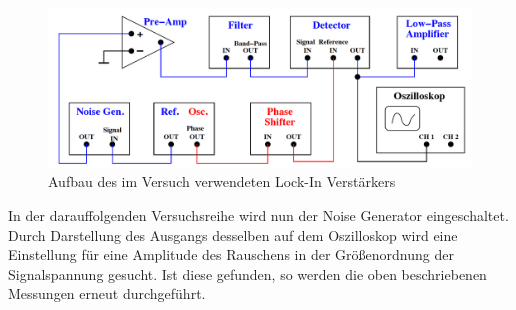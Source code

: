 \begin{figure}
  \centering
  \includegraphics[width=\textwidth]{data/aufbau.png}
  \caption{Aufbau des im Versuch verwendeten Lock-In Verstärkers\cite{Versuchsanleitung}}
  \label{fig:aufbau}
\end{figure}

In der darauffolgenden Versuchsreihe wird nun der Noise Generator eingeschaltet.
Durch Darstellung des Ausgangs desselben auf dem Oszilloskop wird eine Einstellung für eine
Amplitude des Rauschens in der Größenordnung der Signalspannung gesucht. Ist diese
gefunden, so werden die oben beschriebenen Messungen erneut durchgeführt.
